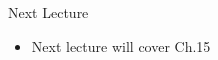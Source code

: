 \documentclass[aspectratio=1610]{beamer}
\begin{document}
%			
%			

\begin{frame}[wide]{Next Lecture}
	\begin{itemize}
		\item Next lecture will cover Ch.15
	\end{itemize}
\end{frame}
\end{document}
